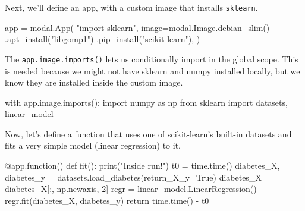 \documentclass[
  letterpaper,
  DIV=11,
  numbers=noendperiod]{scrreprt}
\newenvironment{Shaded}{\begin{snugshade}}{\end{snugshade}}
\newcommand{\AttributeTok}[1]{\textcolor[rgb]{0.40,0.45,0.13}{#1}}
\newcommand{\BuiltInTok}[1]{\textcolor[rgb]{0.00,0.23,0.31}{#1}}
\newcommand{\ControlFlowTok}[1]{\textcolor[rgb]{0.00,0.23,0.31}{#1}}
\newcommand{\DecValTok}[1]{\textcolor[rgb]{0.68,0.00,0.00}{#1}}
\newcommand{\ImportTok}[1]{\textcolor[rgb]{0.00,0.46,0.62}{#1}}
\newcommand{\KeywordTok}[1]{\textcolor[rgb]{0.00,0.23,0.31}{#1}}
\newcommand{\NormalTok}[1]{\textcolor[rgb]{0.00,0.23,0.31}{#1}}
\newcommand{\OperatorTok}[1]{\textcolor[rgb]{0.37,0.37,0.37}{#1}}
\newcommand{\StringTok}[1]{\textcolor[rgb]{0.13,0.47,0.30}{#1}}
\newcommand{\VariableTok}[1]{\textcolor[rgb]{0.07,0.07,0.07}{#1}}
\begin{document}
Next, we'll define an app, with a custom image that installs
\texttt{sklearn}.

\begin{Shaded}
\begin{Highlighting}[]
\NormalTok{app }\OperatorTok{=}\NormalTok{ modal.App(}
    \StringTok{"import{-}sklearn"}\NormalTok{,}
\NormalTok{    image}\OperatorTok{=}\NormalTok{modal.Image.debian\_slim()}
\NormalTok{    .apt\_install(}\StringTok{"libgomp1"}\NormalTok{)}
\NormalTok{    .pip\_install(}\StringTok{"scikit{-}learn"}\NormalTok{),}
\NormalTok{)}
\end{Highlighting}
\end{Shaded}

The \texttt{app.image.imports()} lets us conditionally import in the
global scope. This is needed because we might not have sklearn and numpy
installed locally, but we know they are installed inside the custom
image.

\begin{Shaded}
\begin{Highlighting}[]
\ControlFlowTok{with}\NormalTok{ app.image.imports():}
    \ImportTok{import}\NormalTok{ numpy }\ImportTok{as}\NormalTok{ np}
    \ImportTok{from}\NormalTok{ sklearn }\ImportTok{import}\NormalTok{ datasets, linear\_model}
\end{Highlighting}
\end{Shaded}

Now, let's define a function that uses one of scikit-learn's built-in
datasets and fits a very simple model (linear regression) to it.

\begin{Shaded}
\begin{Highlighting}[]
\AttributeTok{@app.function}\NormalTok{()}
\KeywordTok{def}\NormalTok{ fit():}
    \BuiltInTok{print}\NormalTok{(}\StringTok{"Inside run!"}\NormalTok{)}
\NormalTok{    t0 }\OperatorTok{=}\NormalTok{ time.time()}
\NormalTok{    diabetes\_X, diabetes\_y }\OperatorTok{=}\NormalTok{ datasets.load\_diabetes(return\_X\_y}\OperatorTok{=}\VariableTok{True}\NormalTok{)}
\NormalTok{    diabetes\_X }\OperatorTok{=}\NormalTok{ diabetes\_X[:, np.newaxis, }\DecValTok{2}\NormalTok{]}
\NormalTok{    regr }\OperatorTok{=}\NormalTok{ linear\_model.LinearRegression()}
\NormalTok{    regr.fit(diabetes\_X, diabetes\_y)}
    \ControlFlowTok{return}\NormalTok{ time.time() }\OperatorTok{{-}}\NormalTok{ t0}
\end{Highlighting}
\end{Shaded}
\end{document}
